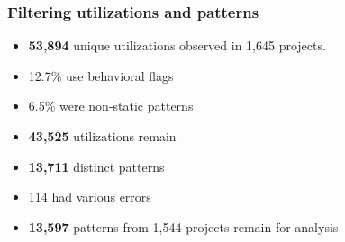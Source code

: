 {
\begin{frame}
\frametitle{Filtering utilizations and patterns}
\begin{itemize}
\item [] \textbf{53,894} unique utilizations observed in 1,645 projects.
\item [] \begin{footnotesize}12.7\% use behavioral flags\end{footnotesize}
\item [] \begin{footnotesize}6.5\% were non-static patterns\end{footnotesize}
\item [] \textbf{43,525} utilizations remain
\item<2-> [] \textbf{13,711} distinct  patterns
\item<2-> [] \begin{footnotesize}114 had various errors\end{footnotesize}
\item<3-> [] \textbf{13,597} patterns from 1,544 projects remain for analysis
\end{itemize}


\end{frame}}
